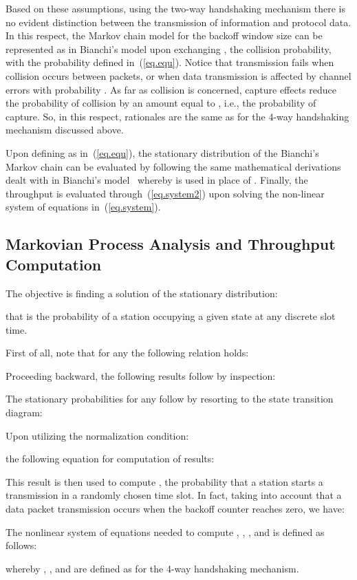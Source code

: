 \documentclass[10pt,onecolumn,a4paper]{IEEEtran}
\begin{document}
Based on these assumptions, using the two-way handshaking
mechanism there is no evident distinction between the transmission
of information and protocol data. In this respect, the Markov
chain model for the backoff window size can be represented as in
Bianchi's model \cite{Bianchi} upon exchanging , the collision
probability, with the probability  defined
in~(\ref{eq.equ}).
Notice that transmission fails when
collision occurs between packets, or when data transmission is
affected by channel errors with probability . As far as
collision is concerned, capture effects reduce the probability of
collision by an amount equal to , i.e., the probability
of capture. So, in this respect, rationales are the same as for
the 4-way handshaking mechanism discussed above.


Upon defining  as in~(\ref{eq.equ}), the stationary
distribution of the Bianchi's Markov chain can be evaluated by
following the same mathematical derivations dealt with in
Bianchi's model~\cite{Bianchi} whereby  is used in place
of . Finally, the throughput is evaluated
through~(\ref{eq.system2}) upon solving the non-linear system of
equations in~(\ref{eq.system}).
\subsection{Markovian Process Analysis and Throughput Computation}
The objective is finding a solution of the stationary
distribution:

that is the probability of a station occupying a given state at
any discrete slot time.

First of all, note that for any  the following
relation holds:

Proceeding backward, the following results follow by inspection:

The stationary probabilities for any  follow by
resorting to the state transition diagram:

Upon utilizing the normalization condition:

the following equation for computation of  results:

This result is then used to compute , the probability that a
station starts a transmission in a randomly chosen time slot. In
fact, taking into account that a data packet transmission occurs
when the backoff counter reaches zero, we have:

The nonlinear system of equations needed to compute ,
, , and  is defined as follows:

whereby , , and  are defined as for the
4-way handshaking mechanism.
\end{document}

